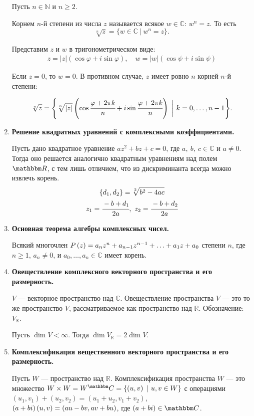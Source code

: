 \begin{enumerate}
Пусть $n\in\mathbb N$ и $n\geqslant2$.

Корнем $n$-й степени из числа $z$ называется всякое $w\in\mathbb C$: $w^n=z$. То есть
\[
\sqrt[n]{z} = \{w\in\mathbb C\ |\ w^n = z\}.
\]

Представим $z$ и $w$ в тригонометрическом виде:
\begin{gather*}
z = |z|\left(\cos\varphi+i\sin\varphi\right), \quad w = |w|\left(\cos\psi+i\sin\psi\right)
\end{gather*}

Если $z=0$, то $w=0$. В противном случае, $z$ имеет ровно $n$ корней $n$-й степени:

\[ \sqrt[n]{z} = \Biggl\{\sqrt[n]{|z|}\left(\cos\cfrac{\varphi+2\pi k}{n}+i\sin\cfrac{\varphi+2\pi k }{n}\right)\ \biggl|\ k=0,\ldots,n-1\Biggr\}.
\]

\item \textbf{Решение квадратных уравнений с комплексными коэффициентами.}

Пусть дано квадратное уравнение $az^2+bz+c=0$, где $a,\ b,\ c\in\mathbb{C}$ и 	$ a \neq 0$. Тогда оно решается аналогично квадратным уравнениям над полем $\R$, с тем лишь отличием, что из дискриминанта всегда можно извлечь корень.
\begin{gather*}
\{d_1,d_2\} = \sqrt[2]{b^2-4ac} \\
z_1 = \cfrac{-b+d_1}{2a},\ z_2 = \cfrac{-b+d_2}{2a}
\end{gather*}

\item \textbf{Основная теорема алгебры комплексных чисел.}

Всякий многочлен $P\left(z\right) = a_nz^n + a_{n-1}z^{n-1} + \ldots \hm{+} a_1z + a_0$ степени $n$, где $n \geqslant 1$, $a_n \neq 0$, и $a_0,\ldots,a_n \in \mathbb{C}$ имеет корень.

\item \textbf{Овеществление комплексного векторного пространства и его размерность.}

$V$ --- векторное пространство над $\mathbb{C}$. Овеществление пространства $V$ --- это то же пространство $V$, рассматриваемое как пространство над $\mathbb{R}$. Обозначение: $V_\mathbb{R}$.

Пусть $\dim V < \infty$. Тогда $\dim V_\mathbb{R} = 2\dim V$.

\item \textbf{Комплексификация вещественного векторного пространства и его размерность.}

Пусть $W$ --- пространство над $\mathbb{R}$. Комплексификация пространства $W$ --- это множество $W\times W = W^\mathbb{C} \hm{=} \{\left( u, v\right)\ |\ u,v \in W\}$ с операциями $\left(u_1, v_1\right) + \left(u_2, v_2\right) = \left(u_1+u_2, v_1+v_2\right)$, $\left(a +  bi\right)\left(u, v\right) \hm{=} \left(au-bv, av+bu\right)$, где $(a + bi) \in \C$.


\end{enumerate}
